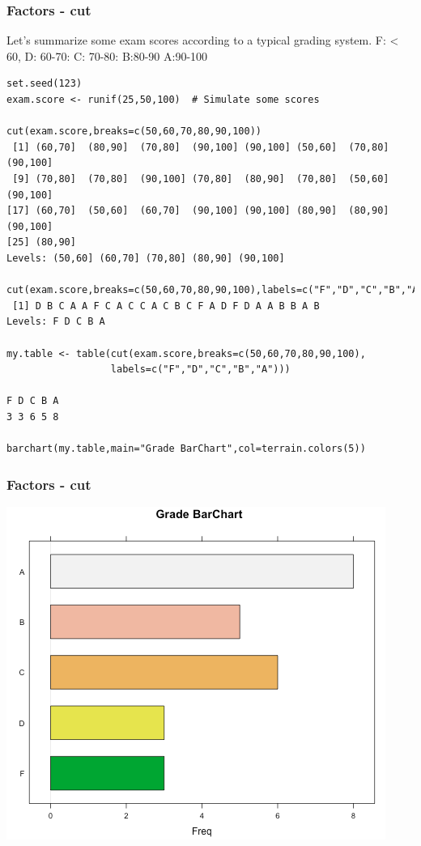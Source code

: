 \documentclass{beamer}
\begin{document}
\begin{frame}[fragile]
\frametitle{Factors - cut}
Let's summarize some exam scores according to a typical grading system.  F: < 60, D: 60-70: C: 70-80: B:80-90 A:90-100
\scriptsize
\begin{verbatim}
set.seed(123)
exam.score <- runif(25,50,100)  # Simulate some scores

cut(exam.score,breaks=c(50,60,70,80,90,100))
 [1] (60,70]  (80,90]  (70,80]  (90,100] (90,100] (50,60]  (70,80]  (90,100]
 [9] (70,80]  (70,80]  (90,100] (70,80]  (80,90]  (70,80]  (50,60]  (90,100]
[17] (60,70]  (50,60]  (60,70]  (90,100] (90,100] (80,90]  (80,90]  (90,100]
[25] (80,90] 
Levels: (50,60] (60,70] (70,80] (80,90] (90,100]

cut(exam.score,breaks=c(50,60,70,80,90,100),labels=c("F","D","C","B","A"))
 [1] D B C A A F C A C C A C B C F A D F D A A B B A B
Levels: F D C B A

my.table <- table(cut(exam.score,breaks=c(50,60,70,80,90,100),
                  labels=c("F","D","C","B","A")))

F D C B A 
3 3 6 5 8 

barchart(my.table,main="Grade BarChart",col=terrain.colors(5))
\end{verbatim}
\end{frame}

%

\begin{frame}[fragile]
\frametitle{Factors - cut}
\begin{center}
\includegraphics{../IMG/bar.png}
\end{center}
\end{frame}
\end{document}
